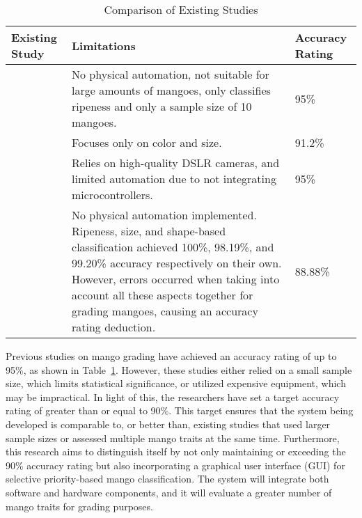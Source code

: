 \begin{table}[h]
	\centering
	\caption{Comparison of Existing Studies}
	\label{tab:comparison_existing_studies}
	\renewcommand{\arraystretch}{1.3}
	\begin{tabular}{p{}|p{}|p{}}
		\hline
		\textbf{Existing Study} & \textbf{Limitations} & \textbf{Accuracy Rating} \\
		\hline
		\citet{adam-non-destructive-2022} & No physical automation, not suitable for large amounts of mangoes, only classifies ripeness and only a sample size of 10 mangoes. & 95\% \\
		\hline
		\citet{school-of-engineering-asia-pacific-college-philippines-carabao-2023} & Focuses only on color and size. & 91.2\% \\
		\hline
		\cite{guillergan-naive-2024} & Relies on high-quality DSLR cameras, and limited automation due to not integrating microcontrollers. & 95\% \\
		\hline
		\citet{supekar-multi-parameter-2020} & No physical automation implemented. Ripeness, size, and shape-based classification achieved 100\%, 98.19\%, and 99.20\% accuracy respectively on their own. However, errors occurred when taking into account all these aspects together for grading mangoes, causing an accuracy rating deduction. & 88.88\% \\
		\hline
	\end{tabular}
\end{table}

Previous studies on mango grading have achieved an accuracy rating of up to 95\%, as
shown in Table~\ref{tab:comparison_existing_studies}. However, these studies either relied on a small sample size, which
limits statistical significance, or utilized expensive equipment, which may be
impractical. In light of this, the researchers have set a target accuracy rating of greater than or equal to 90\%.
This target ensures that the system being developed is comparable to, or better than,
existing studies that used larger sample sizes or assessed multiple mango traits at the
same time. Furthermore, this research aims to distinguish itself by not only maintaining
or exceeding the 90\% accuracy rating but also incorporating a graphical user interface
(GUI) for selective priority-based mango classification. The system will integrate both
software and hardware components, and it will evaluate a greater number of mango
traits for grading purposes.

